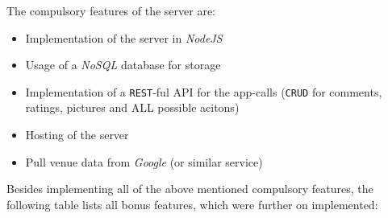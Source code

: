 The compulsory features of the server are:
\begin{itemize}
	\item Implementation of the server in \textit{NodeJS}
	\item Usage of a \textit{NoSQL} database for storage
	\item Implementation of a \texttt{REST}-ful API for the app-calls (\texttt{CRUD} for comments, ratings, pictures and ALL possible acitons)
	\item Hosting of the server
	\item Pull venue data from \textit{Google} (or similar service)	
\end{itemize}

Besides implementing all of the above mentioned compulsory features, the following table lists all bonus features, which were further on implemented:

